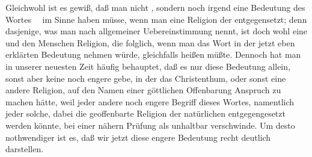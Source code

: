 Gleichwohl ist es gewiß, daß man nicht , sondern noch irgend eine  Bedeutung des Wortes~\  im Sinne haben müsse, wenn man eine  Religion der  entgegensetzt; denn dasjenige, was man nach allgemeiner Uebereinstimmung  nennt, ist doch wohl eine  und den Menschen  Religion, die folglich, wenn man das Wort  in der jetzt eben erklärten Bedeutung nehmen würde, gleichfalls  heißen müßte. Dennoch hat man in unserer neuesten Zeit häufig behauptet, daß es nur diese Bedeutung allein, sonst aber keine noch engere gebe, in der das Christenthum, oder sonst eine andere Religion, auf den Namen einer göttlichen Offenbarung Anspruch zu machen hätte, weil jeder andere noch engere Begriff dieses Wortes, namentlich jeder solche, dabei die geoffenbarte Religion der natürlichen entgegengesetzt werden könnte, bei einer nähern Prüfung als unhaltbar verschwinde. Um desto nothwendiger ist es, daß wir jetzt diese engere Bedeutung recht deutlich darstellen.

